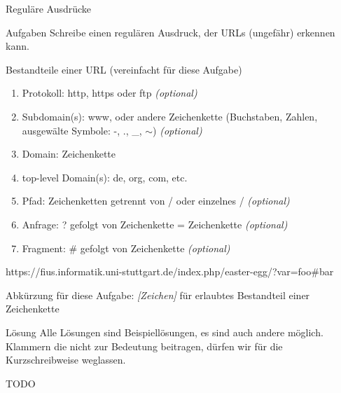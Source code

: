 {
	\begin{frame}{Reguläre Ausdrücke}
		\begin{alertblock}{Aufgaben}
			Schreibe einen regulären Ausdruck, der URLs (ungefähr) erkennen kann.
		\end{alertblock}
		\begin{block}{Bestandteile einer URL (vereinfacht für diese Aufgabe)}
			\begin{enumerate}
				\item \alert<2>{Protokoll}: http, https oder ftp \emph{(optional)}
				\item \alert<3>{Subdomain(s)}: www, oder andere Zeichenkette (Buchstaben, Zahlen, ausgewälte Symbole: -, ., \_, $\sim$) \emph{(optional)}
				\item \alert<4>{Domain}: Zeichenkette
				\item \alert<5>{top-level Domain(s)}: de, org, com, etc.
				\item \alert<6>{Pfad}: Zeichenketten getrennt von / oder einzelnes / \emph{(optional)}
				\item \alert<7>{Anfrage}: ? gefolgt von Zeichenkette = Zeichenkette \emph{(optional)}
				\item \alert<8>{Fragment}: \# gefolgt von Zeichenkette \emph{(optional)}
			\end{enumerate}
			\small{\alert<2>{https}://\alert<3>{fius}.\alert<3>{informatik}.\alert<4>{uni-stuttgart}.\alert<5>{de}\alert<6>{/index.php/easter-egg/}\alert<7>{?var=foo}\alert<8>{\#bar}}
		\end{block}
		\footnotesize{Abkürzung für diese Aufgabe: \emph{[Zeichen]} für erlaubtes Bestandteil einer Zeichenkette}
	\end{frame}
}

{
	\begin{frame}{Lösung}
		Alle Lösungen sind Beispiellösungen, es sind auch andere möglich.\\
		Klammern die nicht zur Bedeutung beitragen, dürfen wir für die Kurzschreibweise weglassen.
		
		TODO
		
	\end{frame}
}

%
%

